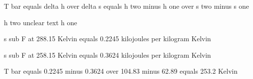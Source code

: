 T bar equals delta h over delta s equals h two minus h one over s two minus s one

h two {unclear text} h one

s sub F at 288.15 Kelvin equals 0.2245 kilojoules per kilogram Kelvin

s sub F at 258.15 Kelvin equals 0.3624 kilojoules per kilogram Kelvin

T bar equals 0.2245 minus 0.3624 over 104.83 minus 62.89 equals 253.2 Kelvin